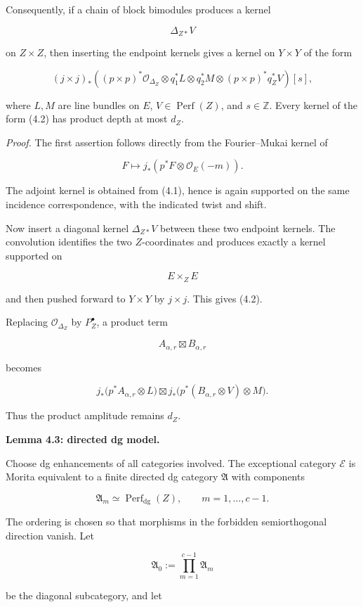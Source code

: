 \documentclass[11pt]{amsart}
\theoremstyle{definition}
\begin{document}
Consequently, if a chain of block bimodules produces a kernel

\[
\Delta_{Z*}V
\]

on $Z\times Z$, then inserting the endpoint kernels gives a kernel on $Y\times Y$ of the form

\[
(j\times j)_*
\left(
(p\times p)^*\mathcal O_{\Delta_Z}
\otimes q_1^*L
\otimes q_2^*M
\otimes (p\times p)^*q_Z^*V
\right)[s],
\tag{4.2}
\]

where $L,M$ are line bundles on $E$, $V\in\operatorname{Perf}(Z)$, and $s\in\mathbb Z$. Every kernel of the form (4.2) has product depth at most $d_Z$.

\noindent\emph{Proof.} The first assertion follows directly from the Fourier--Mukai kernel of

\[
F\mapsto j_*(p^*F\otimes\mathcal O_E(-m)).
\]

The adjoint kernel is obtained from (4.1), hence is again supported on the same incidence correspondence, with the indicated twist and shift.

Now insert a diagonal kernel $\Delta_{Z*}V$ between these two endpoint kernels. The convolution identifies the two $Z$-coordinates and produces exactly a kernel supported on

\[
E\times_ZE
\]

and then pushed forward to $Y\times Y$ by $j\times j$. This gives (4.2).

Replacing $\mathcal O_{\Delta_Z}$ by $P_Z^\bullet$, a product term

\[
A_{\alpha,r}\boxtimes B_{\alpha,r}
\]

becomes

\[
j_*\bigl(p^*A_{\alpha,r}\otimes L\bigr)
\boxtimes
j_*\bigl(p^*(B_{\alpha,r}\otimes V)\otimes M\bigr).
\]

Thus the product amplitude remains $d_Z$.

\noindent\textbf{Lemma 4.3: directed dg model.}

Choose dg enhancements of all categories involved. The exceptional category $\mathcal E$ is Morita equivalent to a finite directed dg category $\mathfrak A$ with components

\[
\mathfrak A_m\simeq \operatorname{Perf}_{\mathrm{dg}}(Z),
\qquad
m=1,\dots,c-1.
\]

The ordering is chosen so that morphisms in the forbidden semiorthogonal direction vanish. Let

\[
\mathfrak A_0:=\prod_{m=1}^{c-1}\mathfrak A_m
\]

be the diagonal subcategory, and let
\end{document}
